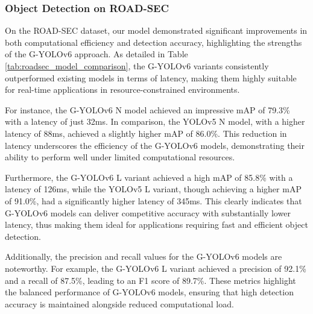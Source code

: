 \subsubsection{Object Detection on ROAD-SEC}

On the ROAD-SEC dataset, our model demonstrated significant improvements in both computational efficiency and detection accuracy, highlighting the strengths of the G-YOLOv6 approach. As detailed in Table \ref{tab:roadsec_model_comparison}, the G-YOLOv6 variants consistently outperformed existing models in terms of latency, making them highly suitable for real-time applications in resource-constrained environments.

For instance, the G-YOLOv6 N model achieved an impressive mAP of 79.3\% with a latency of just 32ms. In comparison, the YOLOv5 N model, with a higher latency of 88ms, achieved a slightly higher mAP of 86.0\%. This reduction in latency underscores the efficiency of the G-YOLOv6 models, demonstrating their ability to perform well under limited computational resources.

Furthermore, the G-YOLOv6 L variant achieved a high mAP of 85.8\% with a latency of 126ms, while the YOLOv5 L variant, though achieving a higher mAP of 91.0\%, had a significantly higher latency of 345ms. This clearly indicates that G-YOLOv6 models can deliver competitive accuracy with substantially lower latency, thus making them ideal for applications requiring fast and efficient object detection.

Additionally, the precision and recall values for the G-YOLOv6 models are noteworthy. For example, the G-YOLOv6 L variant achieved a precision of 92.1\% and a recall of 87.5\%, leading to an F1 score of 89.7\%. These metrics highlight the balanced performance of G-YOLOv6 models, ensuring that high detection accuracy is maintained alongside reduced computational load.

